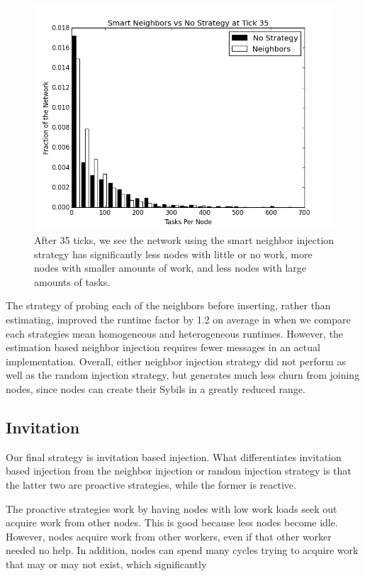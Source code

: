 \begin{figure}
	\centering
	\includegraphics[width=0.7\linewidth]{figs/neighborsStableSmartHist35}
	\caption[Smart Neighbor injection  vs no strategy after 35 ticks.]{After 35 ticks, we see the network using the smart neighbor injection strategy has significantly less nodes with little or no work, more nodes with smaller amounts of work, and less nodes with large amounts of tasks.}
	\label{fig:neighborsStableSmartHist35}
\end{figure}



The strategy of probing each of the neighbors before inserting, rather than estimating, improved the runtime factor by 1.2  on average in when we compare each strategies mean homogeneous and heterogeneous runtimes.
However, the estimation based neighbor injection requires fewer messages in an actual implementation.
Overall, either neighbor injection strategy did not perform as well as the random injection strategy, but generates much less churn from joining nodes, since nodes can create their Sybils in a greatly reduced range.

\subsection{Invitation}
Our final strategy is invitation based injection.
What differentiates invitation based injection from the neighbor injection or random injection strategy is that the latter two are proactive strategies, while the former is reactive.

The proactive strategies work by having nodes with low work loads seek out acquire work from other nodes.
This is good because less nodes become idle.
However, nodes acquire work from other workers, even if that other worker needed no help.
In addition, nodes can spend many cycles trying to acquire work that may or may not exist, which significantly 

